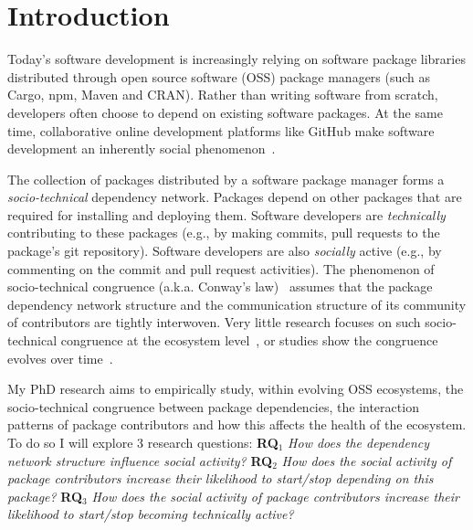 \section{Introduction}
\label{sec:intro}

Today's software development is increasingly relying on software package libraries distributed through open source software (OSS) package managers (such as Cargo, npm, Maven and CRAN). Rather than writing software from scratch, developers often choose to depend on existing software packages.
At the same time, collaborative online development platforms like GitHub make software development an inherently social phenomenon~\cite{DabbishSTH12,Mens2019IEEESW}.

The collection of packages distributed by a software package manager forms a \emph{socio-technical} dependency network. Packages depend on other packages that are required for installing and deploying them. Software developers are \emph{technically} contributing to these packages (e.g., by making commits, pull requests to the package's git repository). Software developers are also \emph{socially} active (e.g., by commenting on the commit and pull request activities).
The phenomenon of socio-technical congruence (a.k.a. Conway's law)~\cite{Conway1968, Herbsleb1999} assumes
that the package dependency network structure and the communication structure of its community of contributors are tightly interwoven. Very little research focuses on such socio-technical congruence at the ecosystem level~\cite{Palyart2018TSE}, or studies show the congruence evolves over time~\cite{Cataldo2008}.

My PhD research %
aims to empirically study, within evolving OSS %
ecosystems, the socio-technical congruence between package dependencies, the interaction patterns of package contributors and how this affects the health of the ecosystem. %
To do so %
I will explore 3 research questions: 
%
\textbf{RQ$_1$} \emph{How does the dependency network structure influence social activity?} %
 \textbf{RQ$_2$} \emph{How does the social activity of package contributors increase their likelihood to start/stop depending on this package?}
\textbf{RQ$_3$} \emph{How does the social activity of package contributors increase their likelihood to start/stop becoming technically active?}


